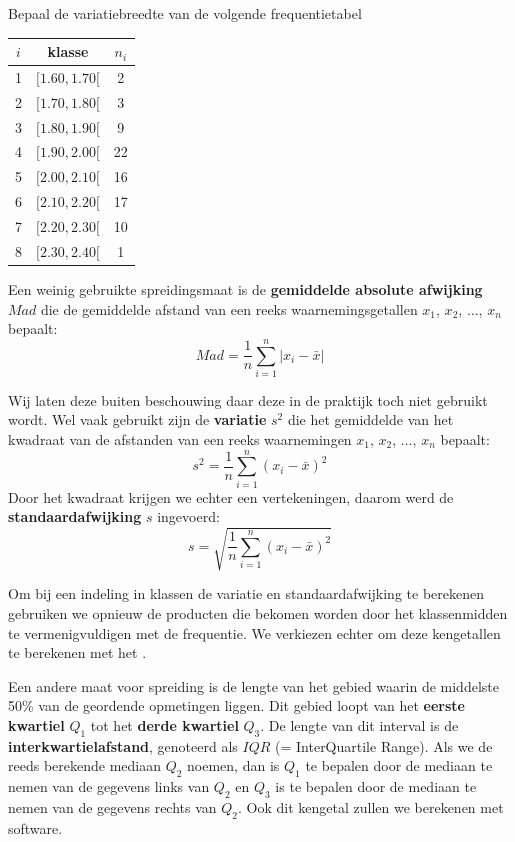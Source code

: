 \documentclass[12pt,twoside]{article}
\begin{document}
\begin{oefening}
Bepaal de variatiebreedte van de volgende frequentietabel
\begin{center}
\begin{tabular}{c|c|c}
$i$ & klasse     & $n_i$\\
\hline
  1 & $[ 1.60,  1.70[$ &   2\\
  2 & $[ 1.70,  1.80[$ &   3\\
  3 & $[ 1.80,  1.90[$ &   9\\
  4 & $[ 1.90,  2.00[$ &   22\\
  5 & $[ 2.00,  2.10[$ &   16\\
  6 & $[ 2.10,  2.20[$ &   17\\
  7 & $[ 2.20,  2.30[$ &   10\\
  8 & $[ 2.30,  2.40[$ &   1\\
\end{tabular}
\end{center}
\end{oefening}

Een weinig gebruikte spreidingsmaat is de {\bf gemiddelde absolute afwijking} $Mad$ die de gemiddelde afstand van een reeks waarnemingsgetallen $x_1$, $x_2$, $\ldots$, $x_n$ bepaalt:
$$Mad=\dfrac{1}{n}\sum_{i=1}^n|x_i-\bar{x}|$$

Wij laten deze buiten beschouwing daar deze in de praktijk toch niet gebruikt wordt. Wel vaak gebruikt zijn de {\bf variatie} $s^2$ die het gemiddelde van het kwadraat van de afstanden van een reeks waarnemingen $x_1$, $x_2$, $\ldots$, $x_n$ bepaalt:
$$s^2=\dfrac{1}{n}\sum_{i=1}^n(x_i-\bar{x})^2$$
Door het kwadraat krijgen we echter een vertekeningen, daarom werd de {\bf standaardafwijking} $s$ ingevoerd:
$$s=\sqrt{\dfrac{1}{n}\sum_{i=1}^n(x_i-\bar{x})^2}$$

Om bij een indeling in klassen de variatie en standaardafwijking te berekenen gebruiken we opnieuw de producten die bekomen worden door het klassenmidden te vermenigvuldigen met de frequentie. We verkiezen echter om deze kengetallen te berekenen met het .

Een andere maat voor spreiding is de lengte van het gebied waarin de middelste 50\% van de
geordende opmetingen liggen. Dit gebied loopt van het {\bf eerste kwartiel} $Q_1$ tot het {\bf derde kwartiel} $Q_3$.
De lengte van dit interval is de {\bf interkwartielafstand}, genoteerd als $IQR$ (= InterQuartile Range).
Als we de reeds berekende mediaan $Q_2$ noemen, dan is $Q_1$ te bepalen door de mediaan te nemen van de
gegevens links van $Q_2$ en $Q_3$ is te bepalen door de mediaan te nemen van de gegevens rechts van $Q_2$. Ook
dit kengetal zullen we berekenen met software.
\end{document}
